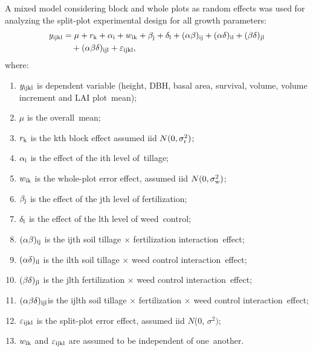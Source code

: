 \documentclass[final]{foresj}
\begin{document}
A mixed model considering block and whole plots as random effects was used
for analyzing the split-plot experimental design for all growth parameters:
\begin{align}\label{eq5}
y_{{\rm ijkl}}  &=\mu + r_{{\rm k}}  +
\alpha_{{\rm i}} + w_{{\rm ik}}  +  \beta_{{\rm j}}  +
 \delta_{{\rm l}} + (\alpha \beta )_{{\rm ij}}  +
(\alpha \delta )_{{\rm il}} + (\beta \delta )_{{\rm jl}}\notag\\
&\quad + (\alpha \beta \delta )_{{\rm ijl}}  +
\varepsilon_{{\rm ijkl}},
\end{align}
where:
\begin{enumerate}
\item[] $y_{{\rm ijkl}}$ is dependent variable (height,
DBH, basal area, survival, volume, volume increment and
LAI plot~mean);

\item[] $\mu$ is the overall~mean;

\item[] $r_{{\rm k}}$ is the kth block effect assumed iid $N(0,\sigma _{{\rm r}}^{2})$;

\item[] $\alpha_{{\rm i}}$ is the effect of the ith level of~tillage;

\item[] $w_{{\rm ik}}$ is the whole-plot error effect, assumed iid
$N(0,\sigma _{{\rm w}}^{2})$;

\item[] $\beta_{{\rm j}}$ is the effect of the jth level of
fertilization;

\item[] $\delta_{{\rm l}}$ is the effect of the lth level of
weed~control;

\item[] $(\alpha \beta)_{{\rm ij}}$ is the ijth soil tillage $\times$ fertilization interaction~effect;

\item[] $(\alpha \delta )_{{\rm il}}$ is the ilth soil tillage $\times$ weed control interaction~effect;

\item[] $(\beta \delta )_{{\rm jl}}$ is the jlth fertilization $\times$ weed control interaction~effect;

\item[] $(\alpha \beta \delta )_{{\rm ijl}}$is the ijlth soil
tillage $\times$ fertilization $\times$ weed control
interaction~effect;

\item[] $\varepsilon_{{\rm ijkl}}$ is the split-plot error effect,
assumed iid $N$(0, $\sigma^{2})$;

\item[] $w_{{\rm ik}}$ and $\varepsilon_{{\rm ijkl}}$ are assumed
to be independent of one~another.
\end{enumerate}
\end{document}
